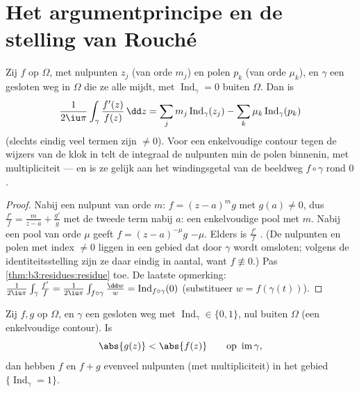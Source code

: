 \section{Het argumentprincipe en de stelling van Rouché}

\begin{theorem}[Argumentprincipe]
\label{thm:b3:residues:argument}
Zij $f$  op $\Omega$, met nulpunten $z_j$ (van orde
$m_j$) en polen $p_k$ (van orde $\mu_k$), en $\gamma$ een
gesloten weg in $\Omega$ die ze alle mijdt, met
$\operatorname{Ind}_\gamma = 0$ buiten $\Omega$. Dan is
\[
\frac1{2\iu\pi}\int_\gamma\frac{f'(z)}{f(z)}\,\dd z
= \sum_j m_j\operatorname{Ind}_\gamma(z_j)
- \sum_k \mu_k\operatorname{Ind}_\gamma(p_k)
\]
(slechts eindig veel termen zijn $\neq 0$). Voor een enkelvoudige
contour tegen de wijzers van de klok in telt de integraal de
nulpunten min de polen binnenin, met multipliciteit --- en is ze
gelijk aan het windingsgetal van de beeldweg $f\circ\gamma$ rond
$0$.
\end{theorem}

\begin{proof}
Nabij een nulpunt van orde $m$: $f = (z-a)^mg$ met $g(a) \neq 0$,
dus $\frac{f'}f = \frac m{z - a} + \frac{g'}g$ met de tweede term
 nabij $a$: een enkelvoudige pool met  $m$. Nabij
een pool van orde $\mu$ geeft $f = (z-a)^{-\mu}g$  $-\mu$.
Elders is $\frac{f'}f$ . (De nulpunten en polen met index
$\neq 0$ liggen in een  gebied dat door $\gamma$ wordt
omsloten; volgens de identiteitsstelling zijn ze daar eindig in
aantal, want $f \not\equiv 0$.) Pas
\cref{thm:b3:residues:residue} toe. De laatste opmerking:
$\frac1{2\iu\pi}\int_\gamma\frac{f'}f =
\frac1{2\iu\pi}\int_{f\circ\gamma}\frac{\dd w}w =
\operatorname{Ind}_{f\circ\gamma}(0)$ (substitueer $w =
f(\gamma(t))$).
\end{proof}

\begin{theorem}[Rouché]\label{thm:b3:residues:rouche}
Zij $f, g$  op $\Omega$, en $\gamma$ een gesloten weg met
$\operatorname{Ind}_\gamma \in \{0,1\}$, nul buiten $\Omega$ (een
enkelvoudige contour). Is
\[
\abs{g(z)} < \abs{f(z)} \qquad \text{op }
\operatorname{im}\gamma,
\]
dan hebben $f$ en $f + g$ evenveel nulpunten (met
multipliciteit) in het gebied $\{\operatorname{Ind}_\gamma =
1\}$.
\end{theorem}

